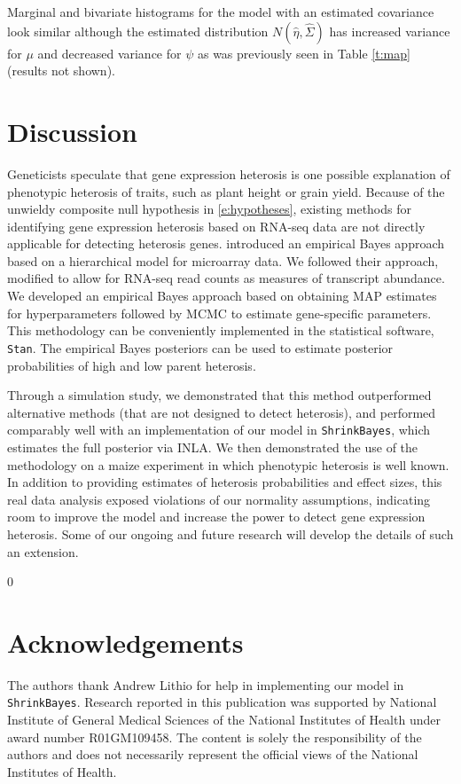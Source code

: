 \documentclass[useAMS,usenatbib,referee]{biom}
\newcommand{\blind}{0} %
\begin{document}
Marginal and bivariate histograms for the model with an estimated covariance look similar although the estimated distribution $N(\hat{\eta},\hat{\Sigma})$ has increased variance for $\mu$ and decreased variance for $\psi$ as was previously seen in Table \ref{t:map} (results not shown). 

\section{Discussion}
\label{s:discussion}

Geneticists speculate that gene expression heterosis is one possible explanation of phenotypic heterosis of traits, such as plant height or grain yield. Because of the unwieldy composite null hypothesis in \eqref{e:hypotheses}, existing methods for identifying gene expression heterosis based on RNA-seq data are not directly applicable for detecting heterosis genes. \cite{ji2014estimation} introduced an empirical Bayes approach based on a hierarchical model for microarray data. We followed their approach, modified to allow for RNA-seq read counts as measures of transcript abundance. We developed an empirical Bayes approach based on obtaining MAP estimates for hyperparameters followed by MCMC to estimate gene-specific parameters. This methodology can be conveniently implemented in the statistical software, {\tt Stan}. The empirical Bayes posteriors can be used to estimate posterior probabilities of high and low parent heterosis.  

Through a simulation study, we demonstrated that this method outperformed alternative methods (that are not designed to detect heterosis), and performed comparably well with an implementation of our model in {\tt ShrinkBayes}, which estimates the full posterior via INLA. We then demonstrated the use of the methodology on a maize experiment in which phenotypic heterosis is well known. 
In addition to providing estimates of heterosis probabilities and effect sizes, this real data analysis exposed violations of our normality assumptions, indicating room to improve the model and increase the power to detect gene expression heterosis. Some of our ongoing and future research will develop the details of such an extension.





\backmatter %

\blind{
\section*{Acknowledgements}

The authors thank Andrew Lithio for help in implementing our model in {\tt ShrinkBayes}. Research reported in this publication was supported by National Institute of General Medical Sciences of the National Institutes of Health under award number R01GM109458. The content is solely the responsibility of the authors and does not necessarily represent the official views of the National Institutes of Health.
} \fi
\end{document}
